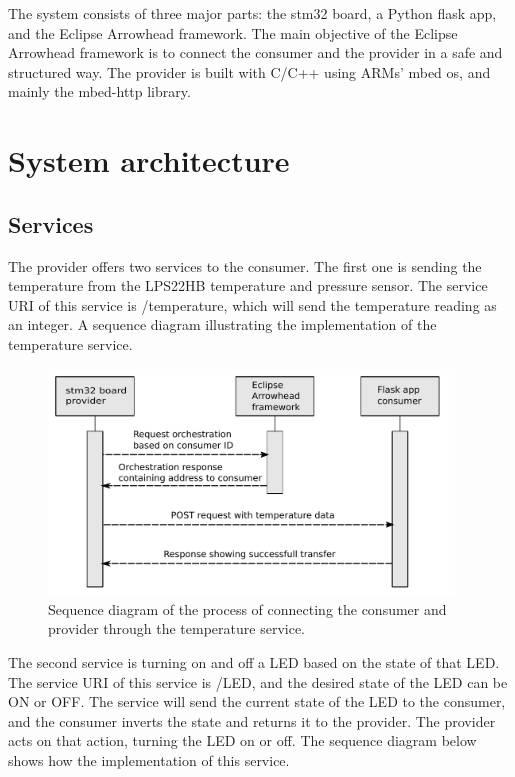 The system consists of three major parts: the stm32 board, a Python flask app, and the Eclipse Arrowhead framework.
The main objective of the Eclipse Arrowhead framework is to connect the consumer and the provider in a safe and structured way.
The provider is built with C/C++ using ARMs' mbed os, and mainly the mbed-http library. 
\section{System architecture}
\subsection{Services}
The provider offers two services to the consumer. 
The first one is sending the temperature from the LPS22HB temperature and pressure sensor. 
The service URI of this service is /temperature, which will send the temperature reading as an integer.
A sequence diagram illustrating the implementation of the temperature service.
\begin{figure}[H]
    \centering
    \includegraphics[width=\textwidth, height=6cm]{Pictures/sequence_diagram_consumer.pdf} 
    \caption{Sequence diagram of the process of connecting the consumer and provider through the temperature service.}
    \label{sequence diagram consumer}
\end{figure}
The second service is turning on and off a LED based on the state of that LED.
The service URI of this service is /LED, and the desired state of the LED can be ON or OFF. 
The service will send the current state of the LED to the consumer, and the consumer inverts the state and returns it to the provider.
The provider acts on that action, turning the LED on or off. 
The sequence diagram below shows how the implementation of this service.
